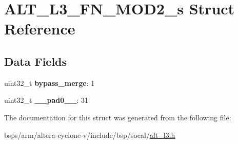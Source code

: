\hypertarget{structALT__L3__FN__MOD2__s}{}\section{A\+L\+T\+\_\+\+L3\+\_\+\+F\+N\+\_\+\+M\+O\+D2\+\_\+s Struct Reference}
\label{structALT__L3__FN__MOD2__s}
\subsection*{Data Fields}
\begin{DoxyCompactItemize}
\item 
\mbox{\label{structALT__L3__FN__MOD2__s_adeaa823db6f11e48123db2e83bb53bfb}} 
uint32\+\_\+t {\bfseries bypass\+\_\+merge}\+: 1
\item 
\mbox{\label{structALT__L3__FN__MOD2__s_ab1c0bc3e1f88bc4ad3646b6be9df6965}} 
uint32\+\_\+t {\bfseries \+\_\+\+\_\+pad0\+\_\+\+\_\+}\+: 31
\end{DoxyCompactItemize}


The documentation for this struct was generated from the following file\+:\begin{DoxyCompactItemize}
\item 
bsps/arm/altera-\/cyclone-\/v/include/bsp/socal/\mbox{\hyperlink{alt__l3_8h}{alt\+\_\+l3.\+h}}\end{DoxyCompactItemize}
